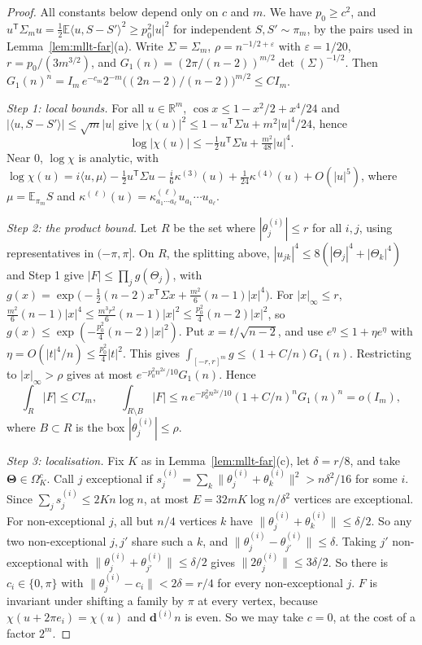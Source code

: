 \documentclass[11pt]{article}
\newcommand{\EE}{\mathbb{E}}
\begin{document}
\begin{proof}
All constants below depend only on \(c\) and \(m\).
We have \(p_0\ge c^2\), and \(u^{\mathsf T}\Sigma_mu=\frac12\EE\langle u,S-S'\rangle^2\ge p_0^2|u|^2\)
for independent \(S,S'\sim\pi_m\), by the pairs used in
Lemma~\ref{lem:mllt-far}(a).
Write \(\Sigma=\Sigma_m\), \(\rho=n^{-1/2+\varepsilon}\) with
\(\varepsilon=1/20\), \(r=p_0/(3m^{3/2})\), and
\(G_1(n)=(2\pi/(n-2))^{m/2}\det(\Sigma)^{-1/2}\).
Then \(G_1(n)^n=I_m\,e^{-c_m}2^{-m}\bigl((2n-2)/(n-2)\bigr)^{m/2}\le CI_m\).

\emph{Step 1: local bounds.}
For all \(u\in\mathbb R^m\), \(\cos x\le1-x^2/2+x^4/24\) and
\(|\langle u,S-S'\rangle|\le\sqrt m|u|\) give
\(|\chi(u)|^2\le1-u^{\mathsf T}\Sigma u+m^2|u|^4/24\), hence
\[
\log|\chi(u)|\le-\tfrac12u^{\mathsf T}\Sigma u+\tfrac{m^2}{48}|u|^4 .
\]
Near \(0\), \(\log\chi\) is analytic, with
\(\log\chi(u)=i\langle u,\mu\rangle-\frac12u^{\mathsf T}\Sigma u-\frac i6\kappa^{(3)}(u)
+\frac1{24}\kappa^{(4)}(u)+O(|u|^5)\), where \(\mu=\EE_{\pi_m}S\) and
\(\kappa^{(\ell)}(u)=\kappa^{(\ell)}_{a_1\cdots a_\ell}u_{a_1}\cdots u_{a_\ell}\).

\emph{Step 2: the product bound.}
Let \(R\) be the set where \(|\theta^{(i)}_j|\le r\) for all \(i,j\), using
representatives in \((-\pi,\pi]\).
On \(R\), the splitting above, \(|u_{jk}|^4\le8(|\Theta_j|^4+|\Theta_k|^4)\) and Step 1 give
\(|F|\le\prod_jg(\Theta_j)\), with
\(g(x)=\exp\bigl(-\frac12(n-2)x^{\mathsf T}\Sigma x+\frac{m^2}6(n-1)|x|^4\bigr)\).
For \(|x|_\infty\le r\), \(\frac{m^2}6(n-1)|x|^4\le\frac{m^3r^2}6(n-1)|x|^2\le\frac{p_0^2}4(n-2)|x|^2\),
so \(g(x)\le\exp(-\frac{p_0^2}4(n-2)|x|^2)\).
Put \(x=t/\sqrt{n-2}\), and use \(e^\eta\le1+\eta e^\eta\) with
\(\eta=O(|t|^4/n)\le\frac{p_0^2}4|t|^2\). This gives
\(\int_{[-r,r]^m}g\le(1+C/n)G_1(n)\).
Restricting to \(|x|_\infty>\rho\) gives at most \(e^{-p_0^2n^{2\varepsilon}/10}G_1(n)\).
Hence
\[
\int_R|F|\le CI_m,
\qquad
\int_{R\setminus B}|F|\le n\,e^{-p_0^2n^{2\varepsilon}/10}(1+C/n)^nG_1(n)^n=o(I_m),
\]
where \(B\subset R\) is the box \(|\theta^{(i)}_j|\le\rho\).

\emph{Step 3: localisation.}
Fix \(K\) as in Lemma~\ref{lem:mllt-far}(c), let \(\delta=r/8\), and take
\(\boldsymbol\Theta\in\Omega_K^c\).
Call \(j\) exceptional if \(s^{(i)}_j=\sum_{k}\|\theta^{(i)}_j+\theta^{(i)}_k\|^2>n\delta^2/16\)
for some \(i\). Since \(\sum_js^{(i)}_j\le2Kn\log n\), at most
\(E=32mK\log n/\delta^2\) vertices are exceptional.
For non-exceptional \(j\), all but \(n/4\) vertices \(k\) have
\(\|\theta^{(i)}_j+\theta^{(i)}_k\|\le\delta/2\). So any two non-exceptional \(j,j'\)
share such a \(k\), and \(\|\theta^{(i)}_j-\theta^{(i)}_{j'}\|\le\delta\).
Taking \(j'\) non-exceptional with \(\|\theta^{(i)}_j+\theta^{(i)}_{j'}\|\le\delta/2\)
gives \(\|2\theta^{(i)}_j\|\le3\delta/2\).
So there is \(c_i\in\{0,\pi\}\) with \(\|\theta^{(i)}_j-c_i\|<2\delta=r/4\) for every
non-exceptional \(j\).
\(F\) is invariant under shifting a family by \(\pi\) at every vertex,
because \(\chi(u+2\pi e_i)=\chi(u)\) and \(\boldsymbol d^{(i)}n\) is even. So we may
take \(c=0\), at the cost of a factor \(2^m\).


\end{proof}
\end{document}
